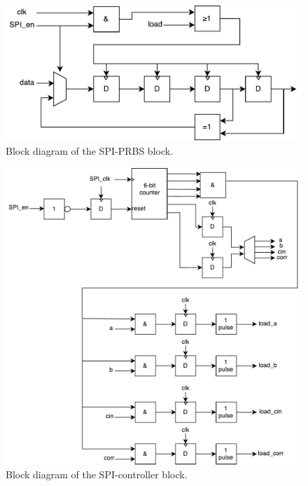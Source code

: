 \begin{figure}[H]
	\centering
	\captionsetup{justification=centering}
	\includegraphics[scale=0.5]{../figures/SPI_PRBS.pdf}
	\caption{Block diagram of the SPI-PRBS block.} \label{fig:spi_prbs}
\end{figure}

\begin{figure}[H]
	\centering
	\captionsetup{justification=centering}
	\includegraphics[scale=0.5]{../figures/SPI_controller.pdf}
	\caption{Block diagram of the SPI-controller block.} \label{fig:spi_controller}
\end{figure}

